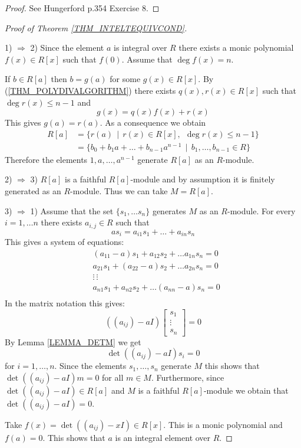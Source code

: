 \documentclass[12pt, letterpaper, oneside]{article}
\theoremstyle{plain}
\theoremstyle{definition}
\newcommand{\vs}{\vskip 5mm}
\begin{document}
\vs

\begin{proof}
See Hungerford  p.354 Exercise 8.
\end{proof}

\vs\vs\vs





\begin{proof}[Proof of Theorem \ref{THM_INTELTEQUIVCOND}] \ 

1) $\Rightarrow$ 2) Since the element $a$  is integral over $R$ there exists 
a monic polynomial $f(x) \in R[x]$ such that $f(0)$. Assume that $\deg f(x) = n$. 

If $b\in R[a]$ then $b = g(a)$ for some $g(x)\in R[x]$.  By (\ref{THM_POLYDIVALGORITHM})
there exists $q(x), r(x)\in R[x]$ such that $\deg r(x) \leq n-1$ and 
$$g(x) = q(x)f(x) + r(x)$$
This gives $g(a) = r(a)$. As a consequence we obtain
\begin{align*}
R[a]  & =   \{ r(a) \  \ |\  \ r(x)\in R[x], \ \ \deg r(x) \leq n-1 \} \\
& = \{  b_{0} + b_{1}a + {\dots}  + b_{n-1}a^{n-1} \ \ | \ \ b_{1}, \dots, b_{n-1}\in R \}
\end{align*}
Therefore the elements $1, a, \dots,  a^{n-1}$ generate $R[a]$ as an $R$-module. 

\vs

2) $\Rightarrow$ 3)  $R[a]$ is a faithful $R[a]$-module and by assumption it is finitely generated 
as an $R$-module. Thus we can take $M = R[a]$. 


\vs

3) $\Rightarrow$ 1)  Assume that the set $\{s_{1}, \dots s_{n}\}$ generates $M$ as an $R$-module. 
For every $i= 1, \dots n$ there exists $a_{i, j}\in R$ such that 
$$as_{i} = a_{i1}s_{1} + {\dots} + a_{in}s_{n} $$
This gives a system of equations:
\begin{align*}
& (a_{11}-a)s_{1}      +  a_{12}s_{2} +  \dots a_{1n}s_{n}           = 0  \\
& a_{21}s_{1}            +  (a_{22}-a)s_{2} +  \dots a_{2n}s_{n}     = 0 \\
& \vdots                                                                                                \ \vdots \\
& a_{n1}s_{1}         +  a_{n2}s_{2} +  \dots (a_{nn}-a)s_{n}     = 0 \\
\end{align*}
In the matrix notation this gives:
$$((a_{ij})-aI) \begin{bmatrix} s_{1} \\ \vdots \\ s_{n} \end{bmatrix} = 0$$  
By Lemma \ref{LEMMA_DETM} we get 
$$\det((a_{ij})-aI)s_{i}=0$$ 
for $i=1, \dots, n$. 
Since the elements $s_{1}, \dots, s_{n}$ generate $M$ this shows that 
$\det((a_{ij})-aI)m=0$ for all $m\in M$. Furthermore, since $\det((a_{ij})-aI)\in R[a]$ and $M$ is 
a faithful $R[a]$-module we obtain that $\det((a_{ij})-aI) = 0$.

Take $f(x) = \det((a_{ij})-xI)\in R[x]$. This is a monic polynomial and $f(a)=0$. 
This shows that $a$ is an integral element over $R$. 
\end{proof}
\end{document}

